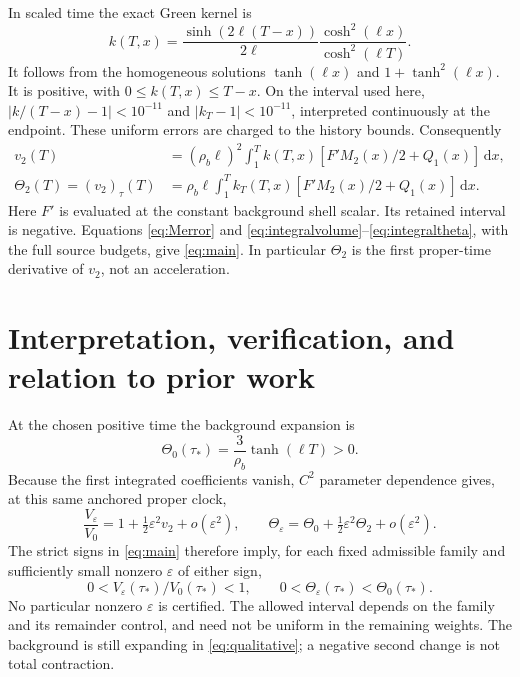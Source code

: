 \documentclass[11pt]{article}
\newcommand{\eps}{\varepsilon}
\newcommand{\dd}{\mathrm d}
\begin{document}
In scaled time the exact Green kernel is
\begin{equation}
 k(T,x)=\frac{\sinh(2\ell(T-x))}{2\ell}
             \frac{\cosh^2(\ell x)}{\cosh^2(\ell T)}. \label{eq:Green}
\end{equation}
It follows from the homogeneous solutions
$\tanh(\ell x)$ and $1+\tanh^2(\ell x)$. It is positive, with
$0\le k(T,x)\le T-x$. On the interval used here,
$|k/(T-x)-1|<10^{-11}$ and $|k_T-1|<10^{-11}$, interpreted continuously
at the endpoint. These uniform errors are charged to the history bounds.
Consequently
\begin{align}
 v_2(T)&=(\rho_b\ell)^2\int_1^T
       k(T,x)[F'M_2(x)/2+Q_1(x)]\,\dd x, \label{eq:integralvolume}\\
 \Theta_2(T)=(v_2)_\tau(T)&=\rho_b\ell\int_1^T
       k_T(T,x)[F'M_2(x)/2+Q_1(x)]\,\dd x. \label{eq:integraltheta}
\end{align}
Here $F'$ is evaluated at the constant background shell scalar. Its
retained interval is negative. Equations \eqref{eq:Merror} and
\eqref{eq:integralvolume}--\eqref{eq:integraltheta}, with the full
source budgets, give \eqref{eq:main}. In particular $\Theta_2$ is the
first proper-time derivative of $v_2$, not an acceleration.

\section{Interpretation, verification, and relation to prior work}

At the chosen positive time the background expansion is
\begin{equation}
 \Theta_0(\tau_*)=\frac{3}{\rho_b}\tanh(\ell T)>0.
\end{equation}
Because the first integrated coefficients vanish, $C^2$ parameter
dependence gives, at this same anchored proper clock,
\begin{equation}
 \frac{V_\eps}{V_0}=1+\tfrac12\eps^2v_2+o(\eps^2),\qquad
 \Theta_\eps=\Theta_0+\tfrac12\eps^2\Theta_2+o(\eps^2).
\end{equation}
The strict signs in \eqref{eq:main} therefore imply, for each fixed
admissible family and sufficiently small nonzero $\eps$ of either sign,
\begin{equation}
       0<V_\eps(\tau_*)/V_0(\tau_*)<1,\qquad
       0<\Theta_\eps(\tau_*)<\Theta_0(\tau_*). \label{eq:qualitative}
\end{equation}
No particular nonzero $\eps$ is certified. The allowed interval depends
on the family and its remainder control, and need not be uniform in the
remaining weights. The background is still expanding in
\eqref{eq:qualitative}; a negative second change is not total contraction.
\end{document}
